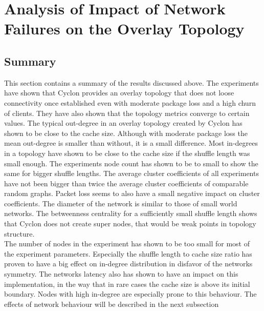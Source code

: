 \chapter{Analysis of Impact of Network Failures on the Overlay Topology} 
\label{chap:evaluation}

\FloatBarrier
\section{Summary}
	This section contains a summary of the results discussed above.
	The experiments have shown that Cyclon provides an overlay topology that does
	not loose connectivity once established even with moderate package loss and a
	high churn of clients. They have also shown that the topology metrics converge
	to certain values. The typical out-degree in an overlay topology created by
	Cyclon has shown to be close to the cache size. Although with moderate package
	loss the mean out-degree is smaller than without, it is a small difference.
	Most in-degrees in a topology have shown to be close to the cache size if the
	shuffle length was small enough. The experiments node count has shown to be to
	small to show the same for bigger shuffle lengths. The average cluster
	coefficients of all experiments have not been bigger than twice the average
	cluster coefficients of comparable random graphs. Packet loss seems to also
	have a small negative impact on cluster coefficients. The diameter of the
	network is similar to those of small world networks. The betweenness
	centrality for a sufficiently small shuffle length shows that Cyclon does not
	create super nodes, that would be weak points in topology structure. \\
	
	The number of nodes in the experiment has shown to be too small for most of the
	experiment parameters. Especially the shuffle length to cache size ratio has
	proven to have a big effect on in-degree distribution in disfavor of the
	networks symmetry. The networks latency also has shown to have an impact on
	this implementation, in the way that in rare cases the cache size is above its
	initial boundary. Nodes with high in-degree are especially prone to this
	behaviour. The effects of network behaviour will be described in the next
	subsection
	
	
